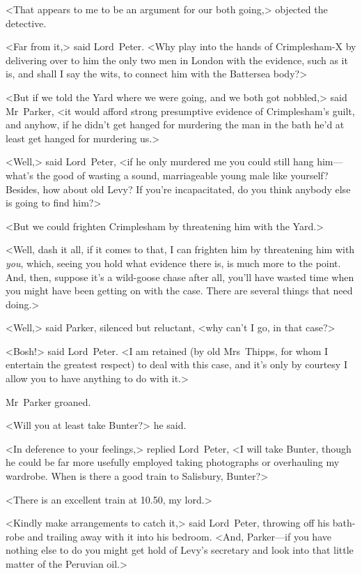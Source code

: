<That appears to me to be an argument for our both going,> objected the detective.

<Far from it,> said Lord~Peter. <Why play into the hands of Crimplesham-X by delivering over to him the only two men in London with the evidence, such as it is, and shall I say the wits, to connect him with the Battersea body?>

<But if we told the Yard where we were going, and we both got nobbled,> said Mr~Parker, <it would afford strong presumptive evidence of Crimplesham's guilt, and anyhow, if he didn't get hanged for murdering the man in the bath he'd at least get hanged for murdering us.>

<Well,> said Lord~Peter, <if he only murdered me you could still hang him—what's the good of wasting a sound, marriageable young male like yourself? Besides, how about old Levy? If you're incapacitated, do you think anybody else is going to find him?>

<But we could frighten Crimplesham by threatening him with the Yard.>

<Well, dash it all, if it comes to that, I can frighten him by threatening him with \textit{you}, which, seeing you hold what evidence there is, is much more to the point. And, then, suppose it's a wild-goose chase after all, you'll have wasted time when you might have been getting on with the case. There are several things that need doing.>

<Well,> said Parker, silenced but reluctant, <why can't I go, in that case?>

<Bosh!> said Lord~Peter. <I am retained (by old Mrs~Thipps, for whom I entertain the greatest respect) to deal with this case, and it's only by courtesy I allow you to have anything to do with it.>

Mr~Parker groaned.

<Will you at least take Bunter?> he said.

<In deference to your feelings,> replied Lord~Peter, <I will take Bunter, though he could be far more usefully employed taking photographs or overhauling my wardrobe. When is there a good train to Salisbury, Bunter?>

<There is an excellent train at 10.50, my lord.>

<Kindly make arrangements to catch it,> said Lord~Peter, throwing off his bath-robe and trailing away with it into his bedroom. <And, Parker—if you have nothing else to do you might get hold of Levy's secretary and look into that little matter of the Peruvian oil.>

